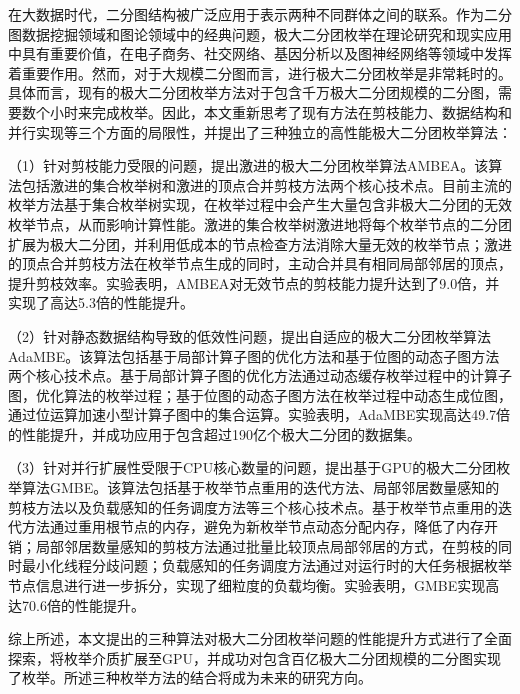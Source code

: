 \cleardoublepage
{}

在大数据时代，二分图结构被广泛应用于表示两种不同群体之间的联系。作为二分图数据挖掘领域和图论领域中的经典问题，极大二分团枚举在理论研究和现实应用中具有重要价值，在电子商务、社交网络、基因分析以及图神经网络等领域中发挥着重要作用。然而，对于大规模二分图而言，进行极大二分团枚举是非常耗时的。具体而言，现有的极大二分团枚举方法对于包含千万极大二分团规模的二分图，需要数个小时来完成枚举。因此，本文重新思考了现有方法在剪枝能力、数据结构和并行实现等三个方面的局限性，并提出了三种独立的高性能极大二分团枚举算法：

（1）针对剪枝能力受限的问题，提出激进的极大二分团枚举算法AMBEA。该算法包括激进的集合枚举树和激进的顶点合并剪枝方法两个核心技术点。目前主流的枚举方法基于集合枚举树实现，在枚举过程中会产生大量包含非极大二分团的无效枚举节点，从而影响计算性能。激进的集合枚举树激进地将每个枚举节点的二分团扩展为极大二分团，并利用低成本的节点检查方法消除大量无效的枚举节点；激进的顶点合并剪枝方法在枚举节点生成的同时，主动合并具有相同局部邻居的顶点，提升剪枝效率。实验表明，AMBEA对无效节点的剪枝能力提升达到了9.0倍，并实现了高达5.3倍的性能提升。

（2）针对静态数据结构导致的低效性问题，提出自适应的极大二分团枚举算法AdaMBE。该算法包括基于局部计算子图的优化方法和基于位图的动态子图方法两个核心技术点。基于局部计算子图的优化方法通过动态缓存枚举过程中的计算子图，优化算法的枚举过程；基于位图的动态子图方法在枚举过程中动态生成位图，通过位运算加速小型计算子图中的集合运算。实验表明，AdaMBE实现高达49.7倍的性能提升，并成功应用于包含超过190亿个极大二分团的数据集。

（3）针对并行扩展性受限于CPU核心数量的问题，提出基于GPU的极大二分团枚举算法GMBE。该算法包括基于枚举节点重用的迭代方法、局部邻居数量感知的剪枝方法以及负载感知的任务调度方法等三个核心技术点。基于枚举节点重用的迭代方法通过重用根节点的内存，避免为新枚举节点动态分配内存，降低了内存开销；局部邻居数量感知的剪枝方法通过批量比较顶点局部邻居的方式，在剪枝的同时最小化线程分歧问题；负载感知的任务调度方法通过对运行时的大任务根据枚举节点信息进行进一步拆分，实现了细粒度的负载均衡。实验表明，GMBE实现高达70.6倍的性能提升。

综上所述，本文提出的三种算法对极大二分团枚举问题的性能提升方式进行了全面探索，将枚举介质扩展至GPU，并成功对包含百亿极大二分团规模的二分图实现了枚举。所述三种枚举方法的结合将成为未来的研究方向。


